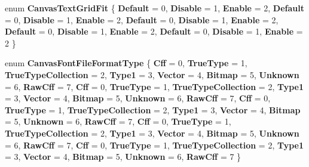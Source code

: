 \begin{DoxyCompactItemize}
enum {\bfseries Canvas\+Text\+Grid\+Fit} \{ \newline
{\bfseries Default} = 0, 
{\bfseries Disable} = 1, 
{\bfseries Enable} = 2, 
{\bfseries Default} = 0, 
\newline
{\bfseries Disable} = 1, 
{\bfseries Enable} = 2, 
{\bfseries Default} = 0, 
{\bfseries Disable} = 1, 
\newline
{\bfseries Enable} = 2, 
{\bfseries Default} = 0, 
{\bfseries Disable} = 1, 
{\bfseries Enable} = 2, 
\newline
{\bfseries Default} = 0, 
{\bfseries Disable} = 1, 
{\bfseries Enable} = 2
 \}
\item 
\mbox{\label{namespace_microsoft_1_1_graphics_1_1_canvas_1_1_text_a70ea121d1ef956464e4adf30172f2a87}} 
enum {\bfseries Canvas\+Font\+File\+Format\+Type} \{ \newline
{\bfseries Cff} = 0, 
{\bfseries True\+Type} = 1, 
{\bfseries True\+Type\+Collection} = 2, 
{\bfseries Type1} = 3, 
\newline
{\bfseries Vector} = 4, 
{\bfseries Bitmap} = 5, 
{\bfseries Unknown} = 6, 
{\bfseries Raw\+Cff} = 7, 
\newline
{\bfseries Cff} = 0, 
{\bfseries True\+Type} = 1, 
{\bfseries True\+Type\+Collection} = 2, 
{\bfseries Type1} = 3, 
\newline
{\bfseries Vector} = 4, 
{\bfseries Bitmap} = 5, 
{\bfseries Unknown} = 6, 
{\bfseries Raw\+Cff} = 7, 
\newline
{\bfseries Cff} = 0, 
{\bfseries True\+Type} = 1, 
{\bfseries True\+Type\+Collection} = 2, 
{\bfseries Type1} = 3, 
\newline
{\bfseries Vector} = 4, 
{\bfseries Bitmap} = 5, 
{\bfseries Unknown} = 6, 
{\bfseries Raw\+Cff} = 7, 
\newline
{\bfseries Cff} = 0, 
{\bfseries True\+Type} = 1, 
{\bfseries True\+Type\+Collection} = 2, 
{\bfseries Type1} = 3, 
\newline
{\bfseries Vector} = 4, 
{\bfseries Bitmap} = 5, 
{\bfseries Unknown} = 6, 
{\bfseries Raw\+Cff} = 7, 
\newline
{\bfseries Cff} = 0, 
{\bfseries True\+Type} = 1, 
{\bfseries True\+Type\+Collection} = 2, 
{\bfseries Type1} = 3, 
\newline
{\bfseries Vector} = 4, 
{\bfseries Bitmap} = 5, 
{\bfseries Unknown} = 6, 
{\bfseries Raw\+Cff} = 7
 \}
\item 
\mbox{\label{namespace_microsoft_1_1_graphics_1_1_canvas_1_1_text_a2a86f72637a3f77480105b5a22f96b31}} 

\end{DoxyCompactItemize}
